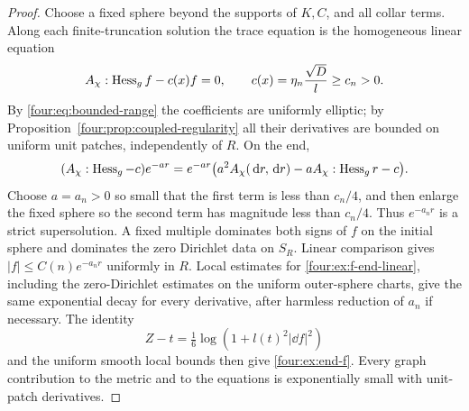 \begin{proof}
Choose a fixed sphere beyond the supports of $K,C$, and all collar
terms.  Along each finite-truncation solution the trace equation is
the homogeneous linear equation
\begin{equation}\label{four:ex:f-end-linear}
 A_\chi:\operatorname{Hess}_g f-c(x)f=0,\qquad
 c(x)=\eta_n\frac{\sqrt D}{l}\ge c_n>0.
\end{equation}
By \eqref{four:eq:bounded-range} the coefficients are uniformly elliptic;
by Proposition~\ref{four:prop:coupled-regularity} all their derivatives are
bounded on uniform unit patches, independently of $R$.  On the end,
\[
 (A_\chi:\operatorname{Hess}_g-c)e^{-ar}
 =e^{-ar}\bigl(a^2A_\chi(\,\mathrm d r,\,\mathrm d r)
          -aA_\chi:\operatorname{Hess}_g r-c\bigr).
\]
Choose $a=a_n>0$ so small that the first term is less than $c_n/4$,
and then enlarge the fixed sphere so the second term has magnitude
less than $c_n/4$.  Thus $e^{-a_nr}$ is a strict supersolution.
A fixed multiple dominates both signs of $f$ on the initial sphere
and dominates the zero Dirichlet data on $S_R$.  Linear comparison
gives $|f|\le C(n)e^{-a_nr}$ uniformly in $R$.  Local estimates for
\eqref{four:ex:f-end-linear}, including the zero-Dirichlet estimates on the
uniform outer-sphere charts, give the same exponential decay for
every derivative, after harmless reduction of $a_n$ if necessary.
The identity
\[
 Z-t=\tfrac16\log(1+l(t)^2|\dd f|^2)
\]
and the uniform smooth local bounds then give
\eqref{four:ex:end-f}.  Every graph contribution to the metric and to the
equations is exponentially small with unit-patch derivatives.


\end{proof}

